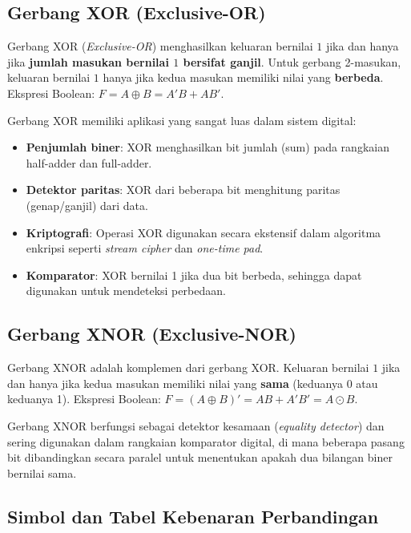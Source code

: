 \subsection{Gerbang XOR (Exclusive-OR)}

\begin{definisi}
Gerbang XOR (\textit{Exclusive-OR}) menghasilkan keluaran bernilai $1$ jika dan hanya jika \textbf{jumlah masukan bernilai $1$ bersifat ganjil}. Untuk gerbang 2-masukan, keluaran bernilai $1$ hanya jika kedua masukan memiliki nilai yang \textbf{berbeda}. Ekspresi Boolean: $F = A \oplus B = A'B + AB'$.
\end{definisi}

Gerbang XOR memiliki aplikasi yang sangat luas dalam sistem digital:
\begin{itemize}
    \item \textbf{Penjumlah biner}: XOR menghasilkan bit jumlah (sum) pada rangkaian half-adder dan full-adder.
    \item \textbf{Detektor paritas}: XOR dari beberapa bit menghitung paritas (genap/ganjil) dari data.
    \item \textbf{Kriptografi}: Operasi XOR digunakan secara ekstensif dalam algoritma enkripsi seperti \textit{stream cipher} dan \textit{one-time pad}.
    \item \textbf{Komparator}: XOR bernilai 1 jika dua bit berbeda, sehingga dapat digunakan untuk mendeteksi perbedaan.
\end{itemize}

\subsection{Gerbang XNOR (Exclusive-NOR)}

\begin{definisi}
Gerbang XNOR adalah komplemen dari gerbang XOR. Keluaran bernilai $1$ jika dan hanya jika kedua masukan memiliki nilai yang \textbf{sama} (keduanya 0 atau keduanya 1). Ekspresi Boolean: $F = (A \oplus B)' = AB + A'B' = A \odot B$.
\end{definisi}

Gerbang XNOR berfungsi sebagai detektor kesamaan (\textit{equality detector}) dan sering digunakan dalam rangkaian komparator digital, di mana beberapa pasang bit dibandingkan secara paralel untuk menentukan apakah dua bilangan biner bernilai sama.

\subsection{Simbol dan Tabel Kebenaran Perbandingan}

